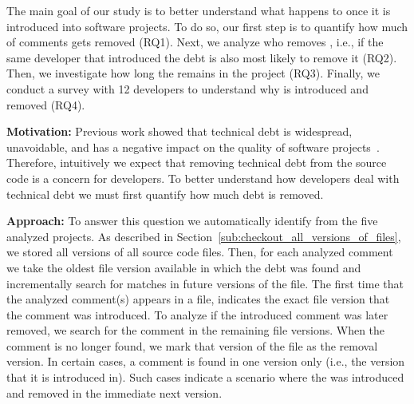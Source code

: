 
The main goal of our study is to better understand what happens to \SATD once it is introduced into software projects. To do so, our first step is to quantify how much of \SATD comments gets removed (RQ1). Next, we analyze who removes \SATD, i.e., if the same developer that introduced the debt is also most likely to remove it (RQ2). Then, we investigate how long the \SATD remains in the project (RQ3). Finally, we conduct a survey with 12 developers to understand why \SATD is introduced and removed (RQ4). 



\noindent\rqi
\noindent \textbf{Motivation:} Previous work showed that technical debt is widespread, unavoidable, and has a negative impact on the quality of software projects~\cite{Lim2012Software}. Therefore, intuitively we expect that removing technical debt from the source code is a concern for developers. To better understand how developers deal with technical debt we must first quantify how much debt is removed. 


\noindent \textbf{Approach:} To answer this question we automatically identify \SATD from the five analyzed projects. As described in Section~\ref{sub:checkout_all_versions_of_files}, we stored all versions of all source code files. Then, for each analyzed \SATD comment we take the oldest file version available in which the debt was found and incrementally search for matches in future versions of the file. The first time that the analyzed \SATD comment(s) appears in a file, indicates the exact file version that the \SATD comment was introduced. To analyze if the introduced \SATD comment was later removed, we search for the comment in the remaining file versions. When the comment is no longer found, we mark that version of the file as the removal version. In certain cases, a \SATD comment is found in one version only (i.e., the version that it is introduced in). Such cases indicate a scenario where the \SATD was introduced and removed in the immediate next version. 



